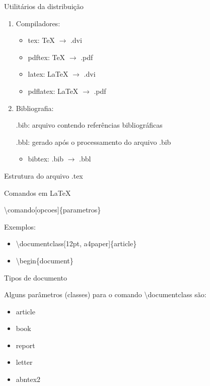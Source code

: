 \documentclass{beamer}
\newcommand{\tbs}{\textbackslash}
\begin{document}
\begin{frame}{Utilit\'arios da distribui\c{c}\~ao}
    \begin{enumerate}
        \item Compiladores:
            \begin{itemize}
                \item tex: TeX $\rightarrow$ .dvi
                \item pdftex: TeX $\rightarrow$ .pdf
                \item latex: LaTeX $\rightarrow$ .dvi
                \item pdflatex: LaTeX $\rightarrow$ .pdf
            \end{itemize}
        \pause 
        \item Bibliografia:

            .bib: arquivo contendo refer\^encias bibliogr\'aficas

            .bbl: gerado ap\'os o processamento do arquivo .bib
            \begin{itemize}
                \item bibtex: .bib $\rightarrow$ .bbl
            \end{itemize}
    \end{enumerate}
\end{frame}

\begin{frame}[fragile]{Estrutura do arquivo .tex}
    
\end{frame}

\begin{frame}{Comandos em \LaTeX}
    \begin{centering}
        \textbackslash comando[opcoes]\{parametros\}
    \end{centering}

    \vspace{1cm}
    Exemplos:
    \begin{itemize}
        \item \textbackslash documentclass[12pt, a4paper]\{article\}
        \item \tbs begin\{document\}
    \end{itemize}
\end{frame}

\begin{frame}{Tipos de documento}

    Alguns par\^ametros (classes) para o comando \tbs documentclass s\~ao:
    \begin{itemize}
        \item article
        \item book
        \item report
        \item letter
        \item abntex2
    \end{itemize}
\end{frame}
\end{document}
